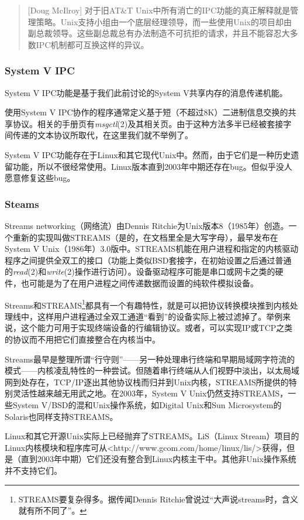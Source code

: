 \documentclass[12pt,oneside]{book}
\begin{document}
\begin{common-format}
\begin{quote}[Doug McIlroy] 
对于旧AT\&{}T Unix中所有消亡的IPC功能的真正解释就是管理策略。Unix支持小组由一个底层经理领导，而一些使用Unix的项目却由副总裁领导。这些副总裁总有办法制造不可抗拒的请求，并且不能容忍大多数IPC机制都可互换这样的异议。
\end{quote}

\subsubsection{System V IPC}
System V IPC功能是基于我们此前讨论的System V共享内存的消息传递机能。

使用System V IPC协作的程序通常定义基于短（不超过8K）二进制信息交换的共享协议。相关的手册页有\textit{msgctl}(2)及其相关页。由于这种方法多半已经被套接字间传递的文本协议所取代，在这里我们就不举例了。

System V IPC功能存在于Linux和其它现代Unix中。然而，由于它们是一种历史遗留功能，所以不很经常使用。Linux版本直到2003年中期还存在bug。但似乎没人愿意修复这些bug。


\subsubsection{Steams}
Streams networking（网络流）由Dennis Ritchie为Unix版本8（1985年）创造。一个重新的实现叫做STREAMS（是的，在文档里全是大写字母），最早发布在System V Unix（1986年）3.0版中。STREAMS机能在用户进程和指定的内核驱动程序之间提供全双工的接口（功能上类似BSD套接字，在初始设置之后通过普通的\textit{read}(2)和\textit{write}(2)操作进行访问）。设备驱动程序可能是串口或网卡之类的硬件，也可能是为了在用户进程之间传递数据而设置的纯软件模拟设备。

Streams和STREAMS\footnote{STREAMS要复杂得多。据传闻Dennis Ritchie曾说过“大声说streams时，含义就有所不同了”。}都具有一个有趣特性，就是可以把协议转换模块推到内核处理线中，这样用户进程通过全双工通道“看到”的设备实际上被过滤掉了。举例来说，这个能力可用于实现终端设备的行编辑协议。或者，可以实现IP或TCP之类的协议而不用把它们直接整合在内核当中。

Streams最早是整理所谓“行守则”——另一种处理串行终端和早期局域网字符流的模式——内核凌乱特性的一种尝试。但随着串行终端从人们视野中淡出，以太局域网到处存在，TCP/IP逐出其他协议栈而归并到Unix内核，STREAMS所提供的特别灵活性越来越无用武之地。在2003年，System V Unix仍然支持STREAMS，一些System V/BSD的混和Unix操作系统，如Digital Unix和Sun Microsystem的Solaris也同样支持STREAMS。

Linux和其它开源Unix实际上已经抛弃了STREAMS。LiS（Linux Stream）项目的Linux内核模块和程序库可从<http://www.gcom.com/home/linux/lis/>获得，但是（直到2003年中期）它们还没有整合到Linux内核主干中。其他非Unix操作系统并不支持它们。



\end{common-format}
\end{document}
